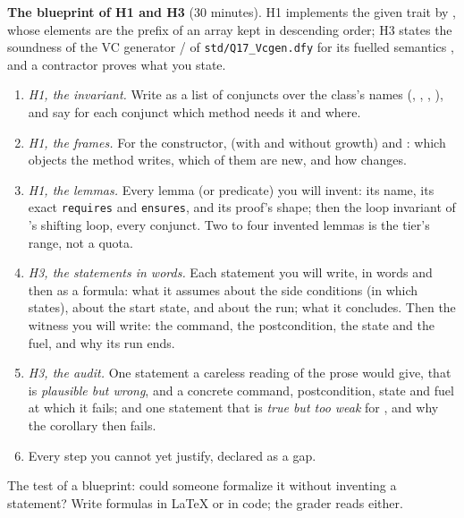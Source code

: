 \documentclass[11pt]{article}
\begin{document}
\begin{problem}\label{prob:B1}
\textbf{The blueprint of H1 and H3} (30 minutes). H1 implements the given
trait  by , whose elements are the prefix
 of an array kept in descending order; H3 states the soundness
of the VC generator / of \texttt{std/Q17\_Vcgen.dfy} for
its fuelled semantics , and a contractor proves what you state.
\begin{enumerate}
\item[(a)] \emph{H1, the invariant.} Write  as a list of
  conjuncts over the class's names (, , ,
  ), and say for each conjunct which method needs it and where.
\item[(b)] \emph{H1, the frames.} For the constructor,  (with
  and without growth) and : which objects the method writes,
  which of them are new, and how  changes.
\item[(c)] \emph{H1, the lemmas.} Every lemma (or predicate) you will
  invent: its name, its exact \texttt{requires} and \texttt{ensures}, and its
  proof's shape; then the loop invariant of 's shifting loop,
  every conjunct. Two to four invented lemmas is the tier's range, not a
  quota.
\item[(d)] \emph{H3, the statements in words.} Each statement you will
  write, in words and then as a formula: what it assumes about the side
  conditions (in which states), about the start state, and about the run;
  what it concludes. Then the witness you will write: the command, the
  postcondition, the state and the fuel, and why its run ends.
\item[(e)] \emph{H3, the audit.} One statement a careless reading of the
  prose would give, that is \emph{plausible but wrong}, and a concrete
  command, postcondition, state and fuel at which it fails; and one
  statement that is \emph{true but too weak} for , and why
  the corollary then fails.
\item[(f)] Every step you cannot yet justify, declared as a gap.
\end{enumerate}
The test of a blueprint: could someone formalize it without inventing a
statement? Write formulas in \LaTeX{} or in  code; the grader reads
either.
\end{problem}
\end{document}
